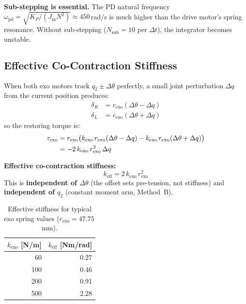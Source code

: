 \documentclass[11pt,a4paper]{article}
\newcommand{\Jm}{J_{\mathrm{m}}}
\begin{document}
\begin{warnbox}
\textbf{Sub-stepping is essential.}
The PD natural frequency $\omega_{\mathrm{pd}} = \sqrt{K_P / (\Jm N^2)} \approx 450$\,rad/s is much higher than the drive motor's spring resonance.
Without sub-stepping ($N_{\mathrm{sub}} = 10$ per $\Delta t$), the integrator becomes unstable.
\end{warnbox}


\subsection{Effective Co-Contraction Stiffness}
\label{sec:co_contraction}

When both exo motors track $q_2 \pm \Delta\theta$ perfectly, a small joint
perturbation $\Delta q$ from the current position produces:
\begin{align}
    \delta_R &= r_{\mathrm{exo}}(\Delta\theta - \Delta q)  \\
    \delta_L &= r_{\mathrm{exo}}(\Delta\theta + \Delta q)
\end{align}
so the restoring torque is:
\begin{align}
    \tau_{\mathrm{exo}} &= r_{\mathrm{exo}}\bigl(k_{\mathrm{exo}}\,r_{\mathrm{exo}}(\Delta\theta - \Delta q) - k_{\mathrm{exo}}\,r_{\mathrm{exo}}(\Delta\theta + \Delta q)\bigr) \notag \\
                        &= -2\,k_{\mathrm{exo}}\,r_{\mathrm{exo}}^2\,\Delta q
\end{align}

\begin{resultbox}
\textbf{Effective co-contraction stiffness:}
\begin{equation}
\boxed{k_{\mathrm{eff}} = 2\,k_{\mathrm{exo}}\,r_{\mathrm{exo}}^2}
\label{eq:keff}
\end{equation}
This is \textbf{independent of $\Delta\theta$} (the offset sets pre-tension, not stiffness) and \textbf{independent of $q_2$} (constant moment arm, Method~B).
\end{resultbox}

\begin{table}[H]
\centering
\caption{Effective stiffness for typical exo spring values ($r_{\mathrm{exo}} = 47.75$\,mm).}
\begin{tabular}{rr}
\toprule
$k_{\mathrm{exo}}$ [N/m] & $k_{\mathrm{eff}}$ [Nm/rad] \\
\midrule
60   & 0.27 \\
100  & 0.46 \\
200  & 0.91 \\
500  & 2.28 \\
\bottomrule
\end{tabular}
\end{table}
\end{document}
